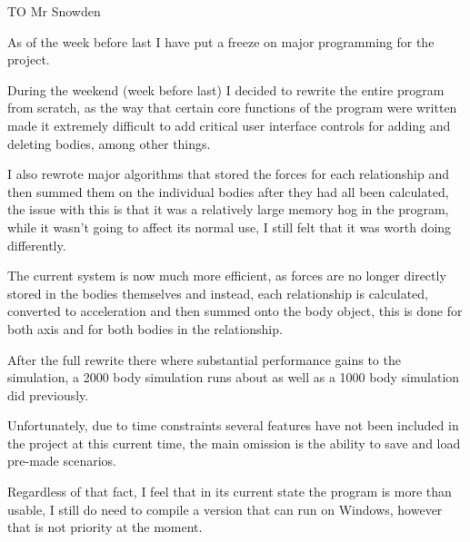 {TO Mr Snowden

As of the week before last I have put a freeze on major programming for the project.

During the weekend (week before last) I decided to rewrite the entire program from scratch, as the way that certain core functions of the program were written made it extremely difficult to add critical user interface controls for adding and deleting bodies, among other things.

I also rewrote major algorithms that stored the forces for each relationship and then summed them on the individual bodies after they had all been calculated, the issue with this is that it was a relatively large memory hog in the program, while it wasn't going to affect its normal use, I still felt that it was worth doing differently.

The current system is now much more efficient, as forces are no longer directly stored in the bodies themselves and instead, each relationship is calculated, converted to acceleration and then summed onto the body object, this is done for both axis and for both bodies in the relationship.

After the full rewrite there where substantial performance gains to the simulation, a 2000 body simulation runs about as well as a 1000 body simulation did previously.

Unfortunately, due to time constraints several features have not been included in the project at this current time, the main omission is the ability to save and load pre-made scenarios.

Regardless of that fact, I feel that in its current state the program is more than usable, I still do need to compile a version that can run on Windows, however that is not priority at the moment.
}